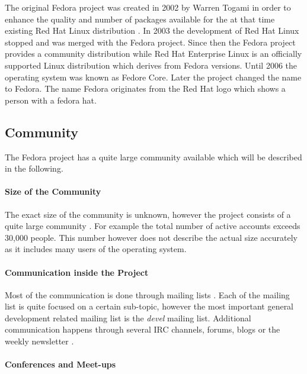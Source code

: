 The original Fedora project was created in 2002 by Warren Togami in order to
enhance the quality and number of packages available for the at that time
existing Red Hat Linux distribution
\cite{FedoraAbout,FedoraTogami,FedoraHistoricalSchedules}. In 2003 the
development of Red Hat Linux stopped and was merged with the Fedora project.
Since then the Fedora project provides a community distribution while Red Hat
Enterprise Linux is an officially supported Linux distribution which derives
from Fedora versions. Until 2006 the operating system was known as Fedore Core.
Later the project changed the name to Fedora. The name Fedora originates from
the Red Hat logo which shows a person with a fedora hat.

\subsection{Community}

The Fedora project has a quite large community available which will be
described in the following.

\paragraph{Size of the Community}

The exact size of the community is unknown, however the project consists of a
quite large community \cite{FedoraStatistics}. For example the total number of
active accounts exceeds 30,000 people. This number however does not describe
the actual size accurately as it includes many users of the operating system.

\paragraph{Communication inside the Project}

Most of the communication is done through mailing lists
\cite{FedoraAbout,FedoraJoin,FedoraSIG}. Each of the mailing list is quite
focused on a certain sub-topic, however the most important general development
related mailing list is the \emph{devel} mailing list. Additional communication
happens through several \ac{IRC} channels, forums, blogs or the weekly
newsletter \cite{FedoraFWN,FedoraCommunicating}.

\paragraph{Conferences and Meet-ups}

